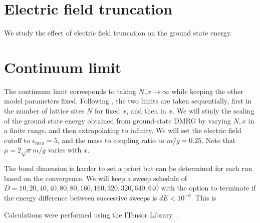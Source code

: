 \documentclass[aps,prl,reprint,superscriptaddress, onecolumn, 11pt]{revtex4-2}
\theoremstyle{definition}
\theoremstyle{definition}
\begin{document}
\section{Electric field truncation}
\label{sec:Etruncation}

We study the effect of electric field truncation on the ground state energy.

\section{Continuum limit}

The continuum limit corresponds to taking $N,x\rightarrow\infty$ while keeping the other model parameters fixed. Following \cite{hamer1982}, the two limits are taken sequentially, first in the number of lattice sites $N$ for fixed $x$, and then in $x$. We will study the scaling of the ground state energy obtained from ground-state DMRG by varying $N,x$ in a finite range, and then extrapolating to infinity. We will set the electric field cutoff to $\epsilon_\max=5$, and the mass to coupling ratio to $m/g=0.25$. Note that $\mu = 2\sqrt{x}m/g$ varies with $x$.

The bond dimension is harder to set a priori but can be determined for each run based on the convergence. We will keep a sweep schedule of $D = {10,20,40,40,80,80,160,160,320,320,640,640}$ with the option to terminate if the energy difference between successive sweeps is $dE < 10^{-6}$. This is 

\begin{acknowledgments}
Calculations were performed using the ITensor Library~\cite{itensor}.
\end{acknowledgments}


\end{document}
